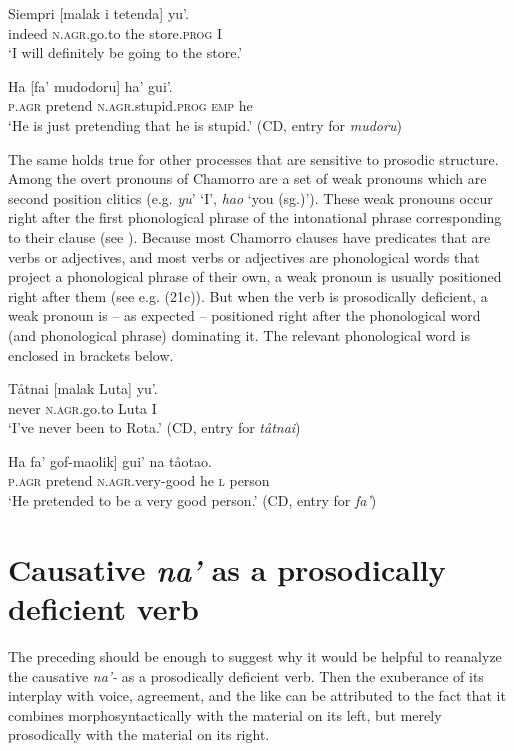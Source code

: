 \documentclass[output=paper,
modfonts
]{LSP/langsci}
\begin{document}
\begin{exe}
\begin{xlist}
\ea
\ea
\gll  Siempri {[}malak i tetenda{]} yu'.\\
indeed \textsc{n.agr.}go.to the store.\textsc{prog} I\\
\glt `I will definitely be going to the store.'

\ex \gll  Ha {[}fa' mudodoru{]} ha' gui'.\\
\textsc{p.agr} pretend \textsc{n.agr.}stupid.\textsc{prog} \textsc{emp} he\\
\glt `He is just pretending that he is stupid.' (CD, entry for \emph{mudoru})
\z
\z

The same holds true for other processes that are sensitive to prosodic
structure. Among the overt pronouns of Chamorro are a set of weak
pronouns which are second position clitics (e.g. \emph{yu}' `I',
\emph{hao} `you (sg.)'). These weak pronouns occur right after the first
phonological phrase of the intonational phrase corresponding to their
clause (see \citealt{chung2003}). Because most Chamorro clauses have predicates
that are verbs or adjectives, and most verbs or adjectives are
phonological words that project a phonological phrase of their own, a
weak pronoun is usually positioned right after them (see e.g. (21c)).
But when the verb is prosodically deficient, a weak pronoun is -- as
expected -- positioned right after the phonological word (and
phonological phrase) dominating it. The relevant phonological word is
enclosed in brackets below.

\ea
\ea
\gll Tåtnai {[}malak Luta{]} yu'.\\
never \textsc{n.agr.}go.to Luta I\\

\glt `I've never been to Rota.' (CD, entry for \emph{tåtnai})

\ex \gll  {[}Ha fa' gof-maolik{]} gui' na tåotao.\\
\textsc{p.agr} pretend \textsc{n.agr.}very-good he \textsc{l} person\\
\glt `He pretended to be a very good person.' (CD, entry for \emph{fa'})
\z
\z

\section{Causative \emph{na'} as a prosodically deficient verb}
The preceding should be enough to suggest why it would be helpful to
reanalyze the causative \emph{na'-} as a prosodically deficient verb.
Then the exuberance of its interplay with voice, agreement, and the like
can be attributed to the fact that it combines morphosyntactically with
the material on its left, but merely prosodically with the material on
its right.


\end{xlist}
\end{exe}
\end{document}

